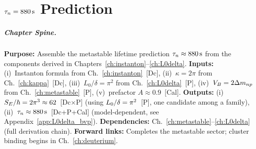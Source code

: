 
\chapter{$\tau_n = 880\,\mathrm{s}$ Prediction}
\label{ch:tau_n}


\begin{abstract}
This chapter assembles the derivation chain: from the instanton formula
(Chapter~\ref{ch:instanton}), the topological factor $\kappa = 2\pi$
(Chapter~\ref{ch:kappa}), and the geometric ratio $\Lzero/\bdelta \approx \pi^2$
(Chapter~\ref{ch:L0delta}), we compute the metastable junction lifetime
$\taun \approx 880\second$. The result contains one postulated component
($\Lzero/\bdelta = \pi^2$~[P]) and one calibrated prefactor ($A \approx 0.9$~[Cal]).
The $< 1\%$ agreement with measured $\taun$ depends on both [P] and [Cal]
choices; a model-dependent eigenvalue analysis (Appendix~\ref{app:L0delta_bvp})
shows $\pi^2$ is one candidate among a continuous family, and the close agreement
is not independently confirmed without calibration.
\end{abstract}

\paragraph{Chapter Spine.}
\textbf{Purpose:} Assemble the metastable lifetime prediction $\taun \approx 880\second$
from the components derived in Chapters~\ref{ch:instanton}--\ref{ch:L0delta}.
\textbf{Inputs:} (i)~Instanton formula from Ch.~\ref{ch:instanton}~[Dc],
(ii)~$\kappa = 2\pi$ from Ch.~\ref{ch:kappa}~[Dc], (iii)~$L_0/\delta = \pi^2$ from Ch.~\ref{ch:L0delta}~[P],
(iv)~$V_B = 2\Delta m_{np}$ from Ch.~\ref{ch:metastable}~[P], (v)~prefactor $A \approx 0.9$~[Cal].
\textbf{Outputs:} (i)~$S_E/\hbar = 2\pi^3 \approx 62$~[Dc$\times$P] (using
$\Lzero/\bdelta = \pi^2$~[P], one candidate among a family),
(ii)~$\taun \approx 880\second$~[Dc+P+Cal] (model-dependent, see
Appendix~\ref{app:L0delta_bvp}).
\textbf{Dependencies:} Ch.~\ref{ch:metastable}--\ref{ch:L0delta} (full derivation chain).
\textbf{Forward links:} Completes the metastable sector; cluster binding begins in Ch.~\ref{ch:deuterium}.

